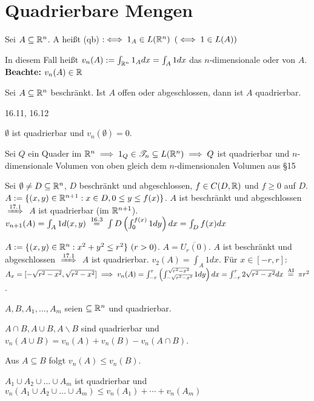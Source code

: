 \documentclass[a4paper,twoside,DIV15,BCOR12mm]{scrbook}
\begin{document}
\chapter{Quadrierbare Mengen}

Sei $A \subseteq \mathbb{R}^n$. A heißt  (qb) $:\iff 1_A \in L(\mathbb{R}^n)$ $(\iff 1\in L(A))$

In diesem Fall heißt $v_n(A) := \int_{\mathbb{R}^n} 1_A dx = \int_A1dx$ das $n$-dimensionale  oder  von $A$.  
\textbf{Beachte:} $v_n(A) \in \mathbb{R}$

\begin{satz}
Sei $A\subseteq\mathbb{R}^n$ beschränkt. Ist $A$ offen oder abgeschlossen, dann ist $A$ quadrierbar.
\end{satz}
\begin{beweis}
16.11, 16.12
\end{beweis}

\begin{beispiele}
\item $\emptyset$ ist quadrierbar und $v_n(\emptyset) = 0$.
\item Sei $Q$ ein Quader im $\mathbb{R}^n \implies 1_Q \in \mathscr{T}_n \subseteq L(\mathbb{R}^n) \implies Q$ ist quadrierbar und $n$-dimensionale Volumen von oben gleich dem $n$-dimensionalen Volumen aus §15
\item Sei $\emptyset \ne D \subseteq \mathbb{R}^n$, $D$ beschränkt und abgeschlossen, $f\in C(D,\mathbb{R})$ und $f\ge 0 $ auf $D$. $A:=\{(x,y) \in \mathbb{R}^{n+1}: x\in D, 0 \le y \le f(x)\}$. $A$ ist beschränkt und abgeschlossen $\folgtnach{17.1}$ $A$ ist quadrierbar (im $\mathbb{R}^{n+1}$). $v_{n+1}(A) = \int_A 1 d(x,y) \gleichnach{16.3} \int D \left(\int_0^{f(x)} 1 dy\right) dx = \int_D f(x)dx$
\item $A:=\{(x,y)\in\MdR^n: x^2+y^2\le r^2\} \ (r>0)$. $A=\overline{U_r(0)}$. $A$ ist beschränkt und abgeschlossen $\folgtnach{17.1}$ $A$ ist quadrierbar. $v_2(A) = \int_A 1 dx$. Für $x\in[-r,r]$: $A_x=[-\sqrt{r^2-x^2}, \sqrt{r^2-x^2}] \folgt v_n(A) = \int _{-r}^r \left( \int _{-\sqrt{r^2-x^2}}^{\sqrt{r^2-x^2}} 1 dy \right) dx = \int_{-r}^r 2 \sqrt{r^2-x^2}dx \gleichnach{AI} \pi r^2$.
\end{beispiele}

\begin{satz}
$A,B,A_1,\ldots,A_m$ seien $\subseteq \mathbb{R}^n$ und quadrierbar.
\begin{liste}
\item $A \cap B, A \cup B, A\backslash B$ sind quadrierbar und\\ $v_n(A\cup B) = v_n(A)+v_n(B)-v_n(A\cap B)$.
\item Aus $A\subseteq B$ folgt $v_n(A) \le v_n(B)$.
\item $A_1 \cup A_2 \cup \ldots \cup A_m$ ist quadrierbar und\\ $v_n(A_1 \cup A_2 \cup \ldots \cup A_m)\le v_n(A_1)+\cdots+v_n(A_m)$
\end{liste}
\end{satz}
\end{document}
